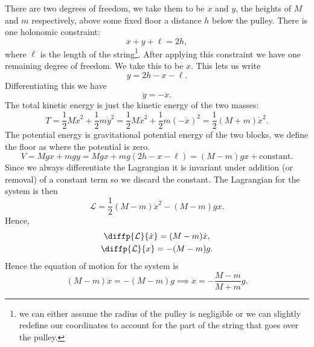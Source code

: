\documentclass[fleqn]{NotesClass}
\newcommand*{\lagrangian}{\mathcal{L}}
\begin{document}
    There are two degrees of freedom, we take them to be \(x\) and \(y\), the heights of \(M\) and \(m\) respectively, above some fixed floor a distance \(h\) below the pulley.
    There is one holonomic constraint:
    \begin{equation}
        x + y + \ell = 2h,
    \end{equation}
    where \(\ell\) is the length of the string\footnote{we can either assume the radius of the pulley is negligible or we can slightly redefine our coordinates to account for the part of the string that goes over the pulley.}.
    After applying this constraint we have one remaining degree of freedom.
    We take this to be \(x\).
    This lets us write
    \begin{equation}
        y = 2h - x - \ell.
    \end{equation}
    Differentiating this we have
    \begin{equation}
        \dot{y} = -\dot{x}.
    \end{equation}
    The total kinetic energy is just the kinetic energy of the two masses:
    \begin{equation}
        T = \frac{1}{2}M\dot{x}^2 + \frac{1}{2}m\dot{y}^2 = \frac{1}{2}M\dot{x}^2 + \frac{1}{2}m(-\dot{x})^2 = \frac{1}{2}(M + m)\dot{x}^2.
    \end{equation}
    The potential energy is gravitational potential energy of the two blocks, we define the floor as where the potential is zero.
    \begin{equation}
        V = Mgx + mgy = Mgx + mg(2h - x - \ell) = (M - m)gx + \text{constant}.
    \end{equation}
    Since we always differentiate the Lagrangian it is invariant under addition (or removal) of a constant term so we discard the constant.
    The Lagrangian for the system is then
    \begin{equation}
        \lagrangian = \frac{1}{2}(M - m)\dot{x}^2 - (M - m)gx.
    \end{equation}
    Hence,
    \begin{gather}
        \diffp{\lagrangian}{\dot{x}} = (M - m)\dot{x},\\
        \diffp{\lagrangian}{x} = -(M - m)g.
    \end{gather}
    Hence the equation of motion for the system is
    \begin{equation}
        (M - m)\ddot{x} = -(M - m)g \implies \ddot{x} = -\frac{M - m}{M + m}g.
    \end{equation}
    
\end{document}
